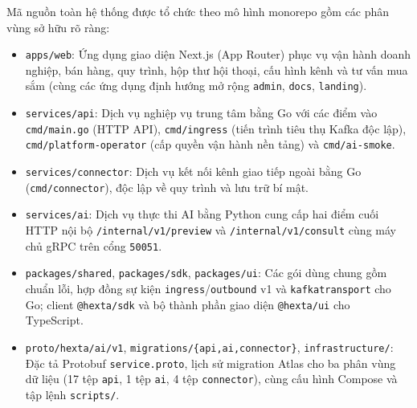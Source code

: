 Mã nguồn toàn hệ thống được tổ chức theo mô hình monorepo gồm các phân vùng sở hữu rõ ràng:
\begin{itemize}
  \item \texttt{apps/web}: Ứng dụng giao diện Next.js (App Router) phục vụ vận hành doanh nghiệp, bán hàng, quy trình, hộp thư hội thoại, cấu hình kênh và tư vấn mua sắm (cùng
    các ứng dụng định hướng mở rộng \texttt{admin}, \texttt{docs}, \texttt{landing}).
  \item \texttt{services/api}: Dịch vụ nghiệp vụ trung tâm bằng Go với các điểm vào \texttt{cmd/\hspace{0pt}main.go} (HTTP API), \texttt{cmd/\hspace{0pt}ingress} (tiến trình tiêu thụ Kafka độc lập),
    \texttt{cmd/\hspace{0pt}platform-\hspace{0pt}operator} (cấp quyền vận hành nền tảng) và \texttt{cmd/\hspace{0pt}ai-\hspace{0pt}smoke}.
  \item \texttt{services/\hspace{0pt}connector}: Dịch vụ kết nối kênh giao tiếp ngoài bằng Go (\texttt{cmd/\hspace{0pt}connector}), độc lập về quy trình và lưu trữ bí mật.
  \item \texttt{services/ai}: Dịch vụ thực thi AI bằng Python cung cấp hai điểm cuối HTTP nội bộ \texttt{/internal/\hspace{0pt}v1/\hspace{0pt}preview} và \texttt{/internal/\hspace{0pt}v1/\hspace{0pt}consult} cùng máy chủ gRPC trên cổng \texttt{50051}.
  \item \texttt{packages/\hspace{0pt}shared}, \texttt{packages/\hspace{0pt}sdk}, \texttt{packages/\hspace{0pt}ui}: Các gói dùng chung gồm chuẩn lỗi, hợp đồng sự kiện \texttt{ingress}/\texttt{outbound} v1 và
    \texttt{kafkatransport} cho Go; client \texttt{@hexta/sdk} và bộ thành phần giao diện \texttt{@hexta/ui} cho TypeScript.
  \item \texttt{proto/\hspace{0pt}hexta/\hspace{0pt}ai/\hspace{0pt}v1}, \texttt{migrations/\hspace{0pt}\{api,ai,connector\}}, \texttt{infrastructure/}: Đặc tả Protobuf \texttt{service.proto}, lịch sử migration Atlas cho ba
    phân vùng dữ liệu (17 tệp \texttt{api}, 1 tệp \texttt{ai}, 4 tệp \texttt{connector}), cùng cấu hình Compose và tập lệnh \texttt{scripts/}.
\end{itemize}

